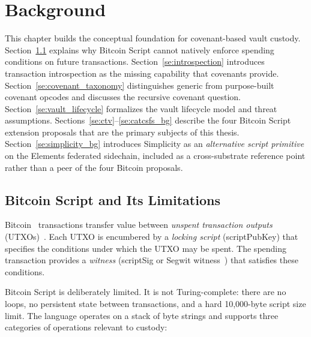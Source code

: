 \chapter{Background} \label{ch:background}

This chapter builds the conceptual foundation for covenant-based vault custody.
Section~\ref{se:script_limits} explains why Bitcoin Script cannot natively enforce
spending conditions on future transactions. Section~\ref{se:introspection} introduces
transaction introspection as the missing capability that covenants provide.
Section~\ref{se:covenant_taxonomy} distinguishes generic from purpose-built covenant
opcodes and discusses the recursive covenant question. Section~\ref{se:vault_lifecycle}
formalizes the vault lifecycle model and threat assumptions.
Sections~\ref{se:ctv}--\ref{se:catcsfs_bg} describe the four Bitcoin Script
extension proposals that are the primary subjects of this thesis.
Section~\ref{se:simplicity_bg} introduces Simplicity as an
\emph{alternative script primitive} on the Elements federated
sidechain, included as a cross-substrate reference point rather than a
peer of the four Bitcoin proposals.

\section{Bitcoin Script and Its Limitations} \label{se:script_limits}

Bitcoin~\cite{Nakamoto08} transactions transfer value between \emph{unspent transaction
outputs} (UTXOs)~\cite{EUTXO20, Antonopoulos17}. Each UTXO is encumbered by a
\emph{locking script} (scriptPubKey) that specifies the conditions under which the UTXO
may be spent. The spending transaction provides a \emph{witness} (scriptSig or Segwit
witness~\cite{BIP141}) that satisfies these conditions.

Bitcoin Script is deliberately limited. It is not Turing-complete: there are no loops,
no persistent state between transactions, and a hard 10{,}000-byte script size limit.
The language operates on a stack of byte strings and supports three categories of
operations relevant to custody:

